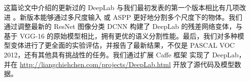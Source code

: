 这篇论文中介绍的更新过的 DeepLab 与我们最初发表的第一个版本相比有几项改进 \cite{chen2014semantic}。新版本能够通过多尺度输入 \cite{farabet2013learning, lin2015efficient, chen2015attention} 或 ASPP 更好地分割多个尺度下的物体。我们通过调整最新的 ResNet \cite{he2015deep} 图像分类 DCNN 构建了 DeepLab 的残差网络变体，与基于 VGG-16 \cite{simonyan2014very} 的原始模型相比，拥有更优的语义分割性能。最后，我们对多种模型变体进行了更全面的实验评估，并报告了最新结果，不仅是 PASCAL VOC 2012，还有其他具有挑战性的任务。我们通过扩展 Caffe 框架 \cite{jia2014caffe} 实现了 DeepLab，并在 \url{http://liangchiehchen.com/projects/DeepLab.html} 开放了源代码及模型数据。
